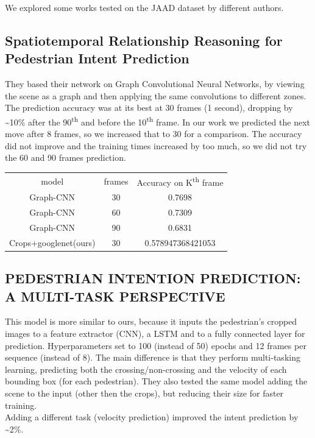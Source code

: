 \documentclass[11pt]{article}
\begin{document}
We explored some works tested on the JAAD dataset by different authors.
\subsection*{Spatiotemporal Relationship Reasoning for Pedestrian Intent Prediction}
They\cite{liu2020spatiotemporal} based their network on
Graph Convolutional Neural Networks\cite{GCNN}, by viewing the scene as a graph and then applying the same convolutions
to different zones.
The prediction accuracy was at its best at 30 frames (1 second), dropping by \textasciitilde 10\% after the 90\textsuperscript{th} and
before the 10\textsuperscript{th} frame.
In our work we predicted the next move after 8 frames, so we increased that to 30 for a comparison.
The accuracy did not improve and the training times increased by too much, so we did not try the 60 and 90 frames prediction.

\begin{center}
\begin{tabular}{| c c c |}\hline
    model & frames & Accuracy on K\textsuperscript{th} frame\\
    Graph-CNN & 30 & 0.7698 \\
    Graph-CNN & 60 & 0.7309 \\
    Graph-CNN & 90 & 0.6831 \\
    Crops+googlenet(ours) & 30 & 0.578947368421053 \\\hline

\end{tabular}
\end{center}

\subsection*{PEDESTRIAN INTENTION PREDICTION: A MULTI-TASK PERSPECTIVE}
This model is more similar to ours, because it inputs the pedestrian's cropped images to a feature extractor (CNN), a
LSTM and to a fully connected layer for prediction.
Hyperparameters set to 100 (instead of 50) epochs and 12 frames per sequence (instead of 8).
The main difference is that they perform multi-tasking learning, predicting both the crossing/non-crossing and the velocity of
each bounding box (for each pedestrian).
They also tested the same model adding the scene to the input (other then the crops), but reducing their size for faster training.\\
Adding a different task (velocity prediction) improved the intent prediction by \textasciitilde 2\%.
\end{document}
